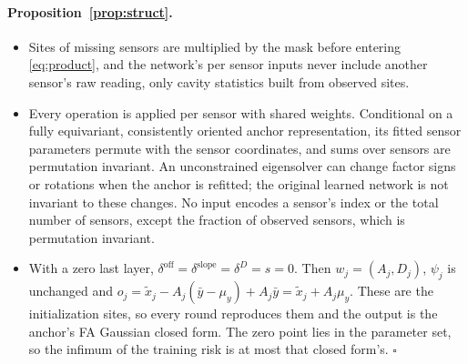 \paragraph{Proposition~\ref{prop:struct}.}
\begin{itemize}
  \item[(i)] Sites of missing sensors are multiplied by the mask before entering \eqref{eq:product}, and the
  network's per sensor inputs never include another sensor's raw reading, only cavity statistics built from observed
  sites.
  \item[(ii)] Every operation is applied per sensor with shared weights. Conditional on a fully equivariant, consistently oriented anchor
  representation, its fitted sensor parameters permute with the sensor coordinates, and sums over sensors are
  permutation invariant. An unconstrained eigensolver can change factor signs or rotations when the anchor is
  refitted; the original learned network is not invariant to these changes. No input encodes a
  sensor's index or the total number of sensors, except the fraction of observed sensors, which is permutation
  invariant.
  \item[(iii)] With a zero last layer, $\delta^{\mathrm{off}}=\delta^{\mathrm{slope}}=\delta^D=s=0$. Then
  $w_j=(A_j,D_j)$, $\psi_j$ is unchanged and $o_j=\tilde x_j-A_j(\bar y-\mu_y)+A_j\bar y=\tilde x_j+A_j\mu_y$. These
  are the initialization sites, so every round reproduces them and the output is the anchor's FA Gaussian closed form. The zero point lies
  in the parameter set, so the infimum of the training risk is at most that closed form's. \hfill$\square$
\end{itemize}

